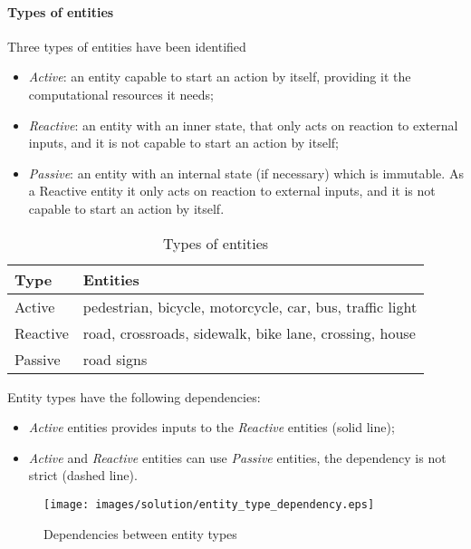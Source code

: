 \paragraph{Types of entities}
Three types of entities have been identified
\begin{itemize}
  \item \textit{Active}: an entity capable to start an action by itself,
  providing it the computational resources it needs;
  \item \textit{Reactive}: an entity with an inner state, that only acts on
reaction to external inputs, and it is not capable to start an action by itself;
  \item \textit{Passive}: an entity with an internal state (if necessary) which
is immutable. As a Reactive entity it only acts on reaction to external inputs,
and it is not capable to start an action by itself.
\end{itemize}
\begin{table}[H]
\centering
\begin{tabular}{|l|l|}
\hline
\rowcolor{BlueGreen}
Type     & Entities                                 \\ \hline
Active   & pedestrian, bicycle, motorcycle, car, bus, traffic light \\ \hline
Reactive & road, crossroads, sidewalk, bike lane, crossing, house \\ \hline
Passive  & road signs                               \\ \hline
\end{tabular}
\caption{Types of entities}
\label{tab:entity_type}
\end{table}
Entity types have the following dependencies:
\begin{itemize}
  \item \textit{Active} entities provides inputs to the \textit{Reactive}
entities (solid line);
  \item \textit{Active} and \textit{Reactive} entities can use \textit{Passive}
entities, the dependency is not strict (dashed line).
\end{itemize}
\begin{figure}[H]
  \centering
  \texttt{[image: images/solution/entity\_type\_dependency.eps]}
  \caption{Dependencies between entity types}
  \label{fig:sd-entity-types-deps}
\end{figure}
